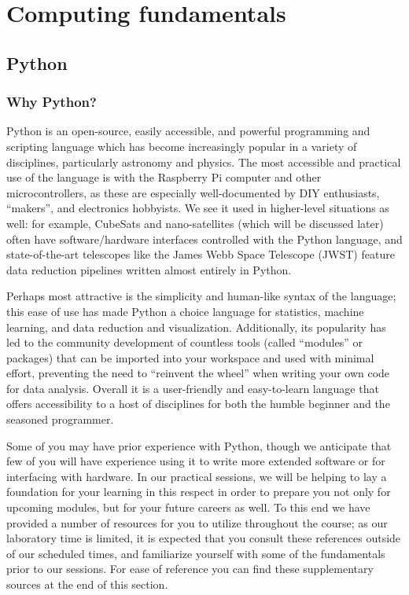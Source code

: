 \documentclass{tufte-book}
\begin{document}
\chapter{Computing fundamentals}
\label{ch:python}

\section{Python}
\label{sec:python}
\subsection{Why Python?}
\label{subsec:python-intro}

{Python} is an open-source, easily accessible, and powerful programming and scripting language which has become increasingly popular in a variety of disciplines, particularly astronomy and physics. The most accessible and practical use of the language is with the Raspberry Pi computer and other microcontrollers, as these are especially well-documented by DIY enthusiasts, ``makers'', and electronics hobbyists. We see it used in higher-level situations as well: for example, CubeSats and nano-satellites (which will be discussed later) often have software/hardware interfaces controlled with the Python language, and state-of-the-art telescopes like the James Webb Space Telescope (JWST) feature data reduction pipelines written almost entirely in Python. 

Perhaps most attractive is the simplicity and human-like syntax of the language; this ease of use has made Python a choice language for statistics, machine learning, and data reduction and visualization. Additionally, its popularity has led to the community development of countless tools (called ``modules'' or packages) that can be imported into your workspace and used with minimal effort, preventing the need to ``reinvent the wheel'' when writing your own code for data analysis. Overall it is a user-friendly and easy-to-learn language that offers accessibility to a host of disciplines for both the humble beginner and the seasoned programmer. 

Some of you may have prior experience with Python, though we anticipate that few of you will have experience using it to write more extended software or for interfacing with hardware. In our practical sessions, we will be helping to lay a foundation for your learning in this respect in order to prepare you not only for upcoming modules, but for your future careers as well. To this end we have provided a number of resources for you to utilize throughout the course; as our laboratory time is limited, it is expected that you consult these references outside of our scheduled times, and familiarize yourself with some of the fundamentals prior to our sessions. For ease of reference you can find these supplementary sources at the end of this section.
\end{document}
